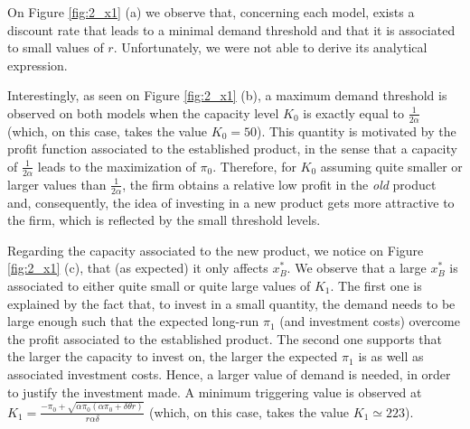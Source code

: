 On Figure \ref{fig:2_x1} (a) we observe that, concerning each model, exists a discount rate that leads to a minimal demand threshold and that it is associated to small values of $r$. Unfortunately, we were not able to derive its analytical expression.

Interestingly, as seen on Figure \ref{fig:2_x1} (b), 
a maximum demand threshold is observed on both models when the capacity level $K_0$ is exactly equal to $\frac{1}{2 \alpha}$ (which, on this case, takes the value $K_0=50$). This quantity is motivated by the profit function associated to the established product, in the sense that a capacity of $\frac{1}{2 \alpha}$ leads to the maximization of $\pi_0$. Therefore, for $K_0$ assuming quite smaller or larger values than $\frac{1}{2 \alpha}$, the firm obtains a relative low profit in the \textit{old} product and, consequently, the idea of investing in a new product gets more attractive to the firm, which is reflected by the small threshold levels.


Regarding the capacity associated to the new product, we notice on Figure \ref{fig:2_x1} (c), that (as expected) it only affects $x_B^*$. We observe that a large $x_B^*$ is associated to either quite small or quite large values of $K_1$. The first one is explained by the fact that, to invest in a small quantity, the demand needs to be large enough such that the expected long-run $\pi_1$ (and investment costs) overcome the profit associated to the established product. The second one supports that the larger the capacity to invest on, the larger the expected $\pi_1$ is as well as associated investment costs. Hence, a larger value of demand is needed, in order to justify the investment made. A minimum triggering value is observed at $K_1=\frac{-\pi_0+\sqrt{\alpha \pi_0(\alpha \pi_0+\delta \theta r)}}{r\alpha \delta}$ (which, on this case, takes the value $K_1\simeq  223$).

	
